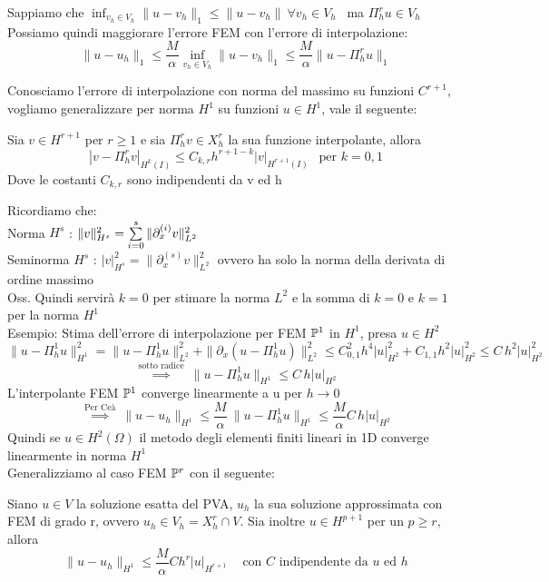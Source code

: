 \documentclass{article}
\newcommand{\om}{\Omega}
\begin{document}
Sappiamo che $\displaystyle \inf_{v_h\in V_h}\|u-v_h\|_1\le \|u-v_h\| \ \forall v_h\in V_h$ \ ma $\Pi_h^r u \in V_h$\\
Possiamo quindi maggiorare l'errore FEM con l'errore di interpolazione:
\[
\|u-u_h\|_1\le\frac{M}{\alpha}\inf_{v_h\in V_h}\|u-v_h\|_1 \le \frac{M}{\alpha}\|u-\Pi_h^r u\|_1
\]
\phantom{}

Conosciamo l'errore di interpolazione con norma del massimo su funzioni $C^{r+1}$, vogliamo generalizzare per norma $H^1$ su funzioni $u\in H^1$, vale il seguente:

\begin{teo}
    Sia $v\in H^{r+1}$ per $r\ge 1$ e sia $\Pi_h^r v\in X_h^r$ la sua funzione interpolante, allora
    \[
    |v-\Pi_h^r v|_{H^k(I)}\le C_{k,r} h^{r+1-k} |v|_{H^{r+1}(I)} \ \ \text{ per } k=0,1
    \]
    Dove le costanti $C_{k,r}$ sono indipendenti da v ed h
\end{teo}

Ricordiamo che:\\
Norma $H^s$ : $\|v\|_{H^s}^2 = \sum\limits_{i=0}^{s} \|\partial_x^{(i)}v\|_{L^2}^2$\\
Seminorma $H^s$ : $|v|_{H^s}^2= \|\partial_x^{(s)}v\|^2_{L^2}$ ovvero ha solo la norma della derivata di ordine massimo\\

Oss. Quindi servirà $k=0$ per stimare la norma $L^2$ e la somma di $k=0$ e $k=1$ per la norma $H^1$\\

Esempio: Stima dell'errore di interpolazione per FEM $\mathbb P^1$ in $H^1$, presa $u\in H^2$
\[
\|u-\Pi_h^1 u\|_{H^1}^2 = \|u-\Pi_h^1 u\|_{L^2}^2 + \|\partial_x(u-\Pi_h^1 u)\|_{L^2}^2 \le C_{0,1}^2 h^4 |u|^2_{H^2} + C_{1,1}h^2|u|^2_{H^2} \le C\,h^2|u|_{H^2}^2 
\]
\[
\overset{\text{sotto radice}}{ \ \implies \ } \ \|u-\Pi_h^1 u\|_{H^1} \le C \, h |u|_{H^2}
\]
L'interpolante FEM $\mathbb P^1$ converge linearmente a u per $h\to0$
\[
\overset{\text{Per Ceà}}{\implies} \ \|u-u_h\|_{H^1}\le \frac{M}{\alpha}\ \|u-\Pi_h^1 u\|_{H^1} \le \frac{M}{\alpha}C \, h |u|_{H^2}
\]
Quindi se $u\in H^2(\om)$ il metodo degli elementi finiti lineari in 1D converge linearmente in norma $H^1$\\


Generalizziamo al caso FEM $\mathbb P^r$ con il seguente:

\begin{teo}
    Siano $u\in V$ la soluzione esatta del PVA, $u_h$ la sua soluzione approssimata con FEM di grado r, ovvero $u_h\in V_h = X_h^r\cap V$.  Sia inoltre $u\in H^{p+1}$ per un $p\ge r$, allora
    \[
    \|u-u_h\|_{H^1} \le \frac{M}{\alpha} C h^r |u|_{H^{r+1}} \ \ \ \ \text{ con } C \text{ indipendente da } u \text{ ed } h
    \]
\end{teo}
\end{document}
